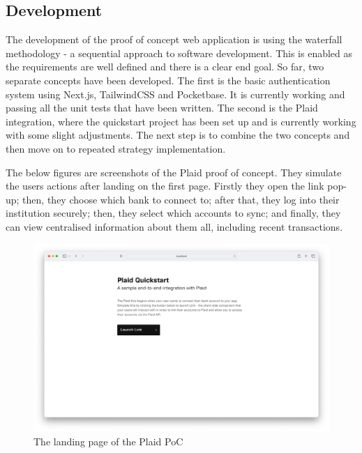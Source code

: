 \subsection{Development}
The development of the proof of concept web application is using the waterfall methodology - a sequential approach to software development. This is enabled as the requirements are well defined and there is a clear end goal. So far, two separate concepts have been developed. The first is the basic authentication system using Next.js, TailwindCSS and Pocketbase. It is currently working and passing all the unit tests that have been written. The second is the Plaid integration, where the quickstart project has been set up and is currently working with some slight adjustments. The next step is to combine the two concepts and then move on to repeated strategy implementation.

The below figures are screenshots of the Plaid proof of concept. They simulate the users actions after landing on the first page. Firstly they open the link pop-up; then, they choose which bank to connect to; after that, they log into their institution securely; then, they select which accounts to sync; and finally, they can view centralised information about them all, including recent transactions.

\begin{figure}[H]
    \centering
    \includegraphics[scale=0.53]{landing_page.png}
	\vspace{-0.8cm}
    \caption{The landing page of the Plaid PoC}
	\label{fig:landing_page}
\end{figure}
    
